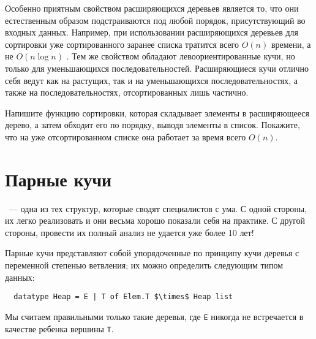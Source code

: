 Особенно приятным свойством расширяющихся деревьев является то, что
они естественным образом подстраиваются под любой порядок,
присутствующий во входных данных. Например, при использовании
расширяющихся деревьев для сортировки уже сортированного заранее
списка тратится всего $O(n)$ времени, а не $O(n \log n)$
\cite{MoffatEddyPetersson1996}. Тем же свойством обладают
левоориентированные кучи, но только для уменьшающихся
последовательностей. Расширяющиеся кучи отлично себя ведут как на
растущих, так и на уменьшающихся последовательностях, а также на
последовательностях, отсортированных лишь частично.

\begin{exercise}\label{ex:5.7}
  Напишите функцию сортировки, которая складывает элементы в
  расширяющееся дерево, а затем обходит его по порядку, выводя
  элементы в список. Покажите, что на уже отсортированном списке она
  работает за время всего $O(n)$.
\end{exercise}

\section{Парные кучи}
\label{sc:5.5}

 \cite{Fredman-etal1986}~--- одна из тех структур, которые
сводят специалистов с ума. С одной стороны, их легко реализовать и они
весьма хорошо показали себя на практике. С другой стороны, провести их
полный анализ не удается уже более 10 лет!

Парные кучи представляют собой упорядоченные по принципу кучи деревья
с переменной степенью ветвления; их можно определить следующим типом
данных:
\begin{lstlisting}
  datatype Heap = E | T of Elem.T $\times$ Heap list
\end{lstlisting}
Мы считаем правильными только такие деревья, где \lstinline!E! никогда
не встречается в качестве ребенка вершины \lstinline!T!.

